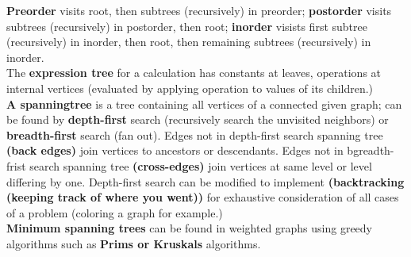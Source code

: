 \documentclass[12pt]{article}
\begin{document}
\textbf{Preorder} visits root, then subtrees (recursively) in preorder; \textbf{postorder} visits subtrees (recursively) in postorder, then root; \textbf{inorder} visists first subtree (recursively) in inorder, then root, then remaining subtrees (recursively) in inorder. \\
The \textbf{expression tree} for a calculation has constants at leaves, operations at internal vertices (evaluated by applying operation to values of its children.) \\
\textbf{A spanningtree} is a tree containing all vertices of a connected given graph; can be found by \textbf{depth-first} search (recursively search the unvisited neighbors) or \textbf{breadth-first} search (fan out). Edges not in depth-first search spanning tree \textbf{(back edges)} join vertices to ancestors or descendants. Edges not in bgreadth-frist search spanning tree \textbf{(cross-edges)} join vertices at same level or level differing by one. Depth-first search can be modified to implement \textbf{(backtracking (keeping track of where you went))} for exhaustive consideration of all cases of a problem (coloring a graph for example.) \\
\textbf{Minimum spanning trees} can be found in weighted graphs using greedy algorithms such as \textbf{Prims or Kruskals} algorithms. \
\end{document}
